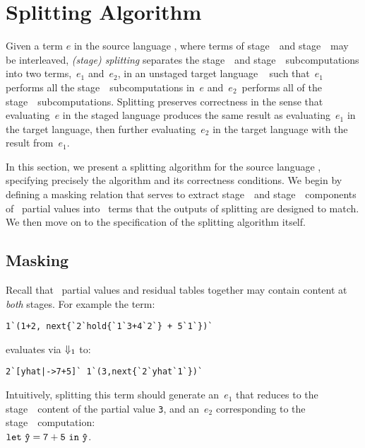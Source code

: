 \section{Splitting Algorithm}
\label{sec:splitting}




Given a term $e$ in the source language \lang, where terms of
stage~\bbone\ and stage~\bbtwo\ may be interleaved, \emph{(stage)
  splitting} separates the stage~\bbone\ and stage~\bbtwo\
subcomputations into two terms,~$e_1$ and~$e_2$, in an unstaged target language \langmono\ 
such that~$e_1$ performs all the
stage~\bbone\ subcomputations in~$e$ and~$e_2$~performs all of the
stage~\bbtwo\ subcomputations. Splitting preserves correctness in the sense that evaluating~$e$ in
the staged language produces the same result as evaluating~$e_1$ in the target language,
then further evaluating~$e_2$ in the target language with the result from~$e_1$.

In this section, we present a
splitting algorithm for the source language \lang, specifying
precisely the algorithm and its correctness conditions.  
We begin by defining a masking relation that serves to extract stage~\bbone\ and
stage~\bbtwo\ components of \lang\ partial values into \langmono\ terms that the outputs of splitting are designed to match. We then 
move on to the specification of the splitting algorithm itself.


\subsection{Masking}


Recall that \lang\ partial values and residual tables together may
contain content at \emph{both} stages. For example the term:
\begin{lstlisting}
1`(1+2, next{`2`hold{`1`3+4`2`} + 5`1`})`
\end{lstlisting}
evaluates via ${\Downarrow_{ 1}}$ to:
\begin{lstlisting}
2`[yhat|->7+5]` 1`(3,next{`2`yhat`1`})`
\end{lstlisting}
Intuitively, splitting this term should generate an~$e_1$ that reduces to the stage~\bbone\ content of the partial value \texttt{3},
and an~$e_2$ corresponding to the stage~\bbtwo\ computation: \\
${\tt let}~{\mathtt{\hat y}} = {\mathtt{7+5}}~{\tt in}~{\mathtt{\hat y}}$.

